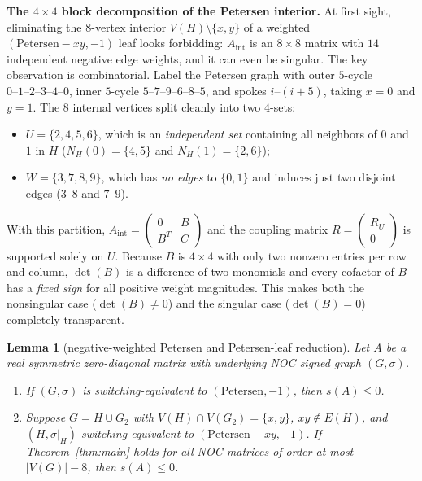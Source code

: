 \documentclass[10pt,letterpaper]{article}
\theoremstyle{zetaplain}
\newtheorem{lemma}[theorem]{Lemma}
\theoremstyle{zetadef}
\theoremstyle{remark}
\numberwithin{equation}{section}
\begin{document}
\noindent\textbf{The $4 \times 4$ block decomposition of the Petersen interior.}
At first sight, eliminating the $8$-vertex interior $V(H) \setminus \{x, y\}$ of a weighted $(\mathrm{Petersen} - xy, -1)$ leaf looks forbidding: $A_{\mathrm{int}}$ is an $8 \times 8$ matrix with $14$ independent negative edge weights, and it can even be singular. The key observation is combinatorial. Label the Petersen graph with outer $5$-cycle $0\text{--}1\text{--}2\text{--}3\text{--}4\text{--}0$, inner $5$-cycle $5\text{--}7\text{--}9\text{--}6\text{--}8\text{--}5$, and spokes $i\text{--}(i+5)$, taking $x = 0$ and $y = 1$. The $8$ internal vertices split cleanly into two $4$-sets:
\begin{itemize}
  \item $U = \{2, 4, 5, 6\}$, which is an \emph{independent set} containing all neighbors of $0$ and $1$ in $H$ ($N_H(0) = \{4, 5\}$ and $N_H(1) = \{2, 6\}$);
  \item $W = \{3, 7, 8, 9\}$, which has \emph{no edges} to $\{0, 1\}$ and induces just two disjoint edges ($3\text{--}8$ and $7\text{--}9$).
\end{itemize}
With this partition, $A_{\mathrm{int}} = \begin{pmatrix} 0 & B \\ B^T & C \end{pmatrix}$ and the coupling matrix $R = \begin{pmatrix} R_U \\ 0 \end{pmatrix}$ is supported solely on $U$. Because $B$ is $4 \times 4$ with only two nonzero entries per row and column, $\det(B)$ is a difference of two monomials and every cofactor of $B$ has a \emph{fixed sign} for all positive weight magnitudes. This makes both the nonsingular case ($\det(B) \ne 0$) and the singular case ($\det(B) = 0$) completely transparent.

\begin{lemma}[negative-weighted Petersen and Petersen-leaf reduction]\label{lem:Petersen}
Let $A$ be a real symmetric zero-diagonal matrix with underlying NOC signed graph $(G, \sigma)$.
\begin{enumerate}
  \item[(1)] If $(G, \sigma)$ is switching-equivalent to $(\mathrm{Petersen}, -1)$, then $s(A) \le 0$.
  \item[(2)] Suppose $G = H \cup G_2$ with $V(H) \cap V(G_2) = \{x, y\}$, $xy \notin E(H)$, and $(H, \sigma|_H)$ switching-equivalent to $(\mathrm{Petersen} - xy, -1)$. If Theorem~\ref{thm:main} holds for all NOC matrices of order at most $|V(G)| - 8$, then $s(A) \le 0$.
\end{enumerate}
\end{lemma}
\end{document}
